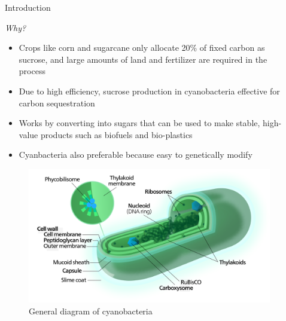 \documentclass[final]{beamer}
\newlength{\onecolwid}
\newlength{\twocolwid}
\begin{document}
\begin{frame}[t]
\begin{columns}[t]
\begin{column}{\onecolwid}
\begin{block}{Introduction}
\begin{center}
\textit{Why?}
\end{center}

\begin{itemize}
\item Crops like corn and sugarcane only allocate 20\% of fixed carbon as sucrose, and large amounts of land and fertilizer are required in the process \cite{Ducat:2012jd}
\item Due to high efficiency, sucrose production in cyanobacteria effective for carbon sequestration
\item Works by converting  into  sugars that can be used to make stable, high-value products such as biofuels and bio-plastics
\item Cyanbacteria also preferable because easy to genetically modify
\end{itemize}

\end{block}

\begin{figure}
\includegraphics[width=0.8\linewidth]{cyano.png}
\caption{General diagram of cyanobacteria \cite{WikipediaEN:AFM}}
\end{figure}

\end{column} %

\begin{column}{\twocolwid} %

\begin{columns}[t,totalwidth=\twocolwid] %

\begin{column}{\onecolwid} %



\end{column}
\end{columns}
\end{column}
\end{columns}
\end{frame}
\end{document}
